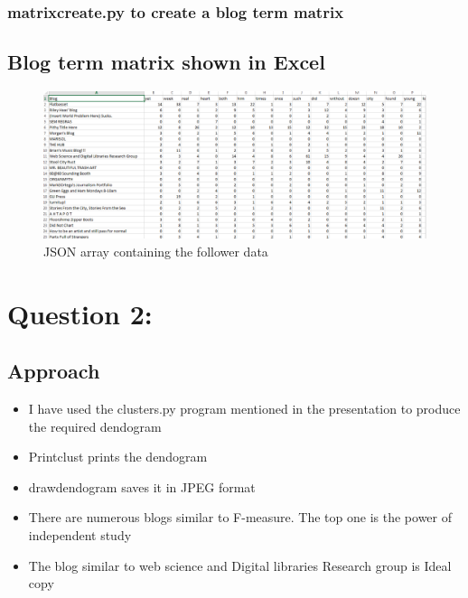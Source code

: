 \documentclass[12pt]{article}
\begin{document}
\subsubsection{matrixcreate.py to create a blog term matrix }

\newpage


\subsection{Blog term matrix shown in Excel }
\begin{figure}[ht]
\includegraphics[scale=0.7]{../../q1/output.png}
\centering
\caption{JSON array containing the follower data}
\label{fig:JSON array containing the follower data}
\end{figure}





\newpage
\section{Question 2: }

\subsection{Approach}
\begin{itemize}
\item I have used the clusters.py program mentioned in the presentation to produce the required dendogram
\item Printclust prints the dendogram 
\item drawdendogram saves it in JPEG format
\item There are numerous blogs similar to F-measure. The top one is the power of independent study
\item The blog similar to web science and Digital libraries Research group is Ideal copy
\end{itemize}
\end{document}
